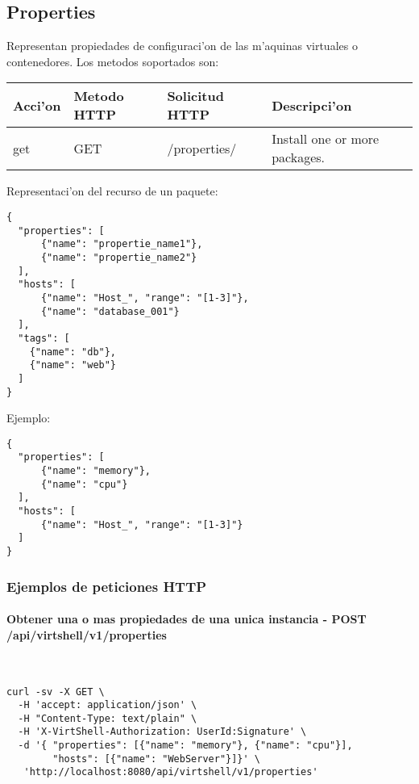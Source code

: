 \subsection{Properties}
Representan propiedades de configuraci'on de las m'aquinas virtuales o contenedores. Los metodos soportados son:

\begin{center}
 \begin{tabular}{| l | l | l | l |}
 \hline
  \rowcolor{blueapi}
  \textbf{Acci'on} & \textbf{Metodo HTTP} & \textbf{Solicitud HTTP} & \textbf{Descripci'on} \\ [0.5ex] 
  \hline\hline
  get & GET & /properties/ & Install one or more packages. \\ [1ex] 
  \hline
\end{tabular}
\end{center}

\vspace{1cm}
Representaci'on del recurso de un paquete:
\vspace{1cm}

\begin{lstlisting}[style=json]
{
  "properties": [
      {"name": "propertie_name1"},
      {"name": "propertie_name2"}
  ],
  "hosts": [ 
      {"name": "Host_", "range": "[1-3]"}, 
      {"name": "database_001"}
  ],
  "tags": [
    {"name": "db"},
    {"name": "web"}
  ]
}
\end{lstlisting}

Ejemplo:

\medskip
\begin{lstlisting}[style=json]
{
  "properties": [
      {"name": "memory"},
      {"name": "cpu"}
  ],
  "hosts": [ 
      {"name": "Host_", "range": "[1-3]"}
  ]
}
\end{lstlisting}

\subsubsection{Ejemplos de peticiones HTTP}

\paragraph{Obtener una o mas propiedades de una unica instancia - POST /api/virtshell/v1/properties} ~\\

\begin{lstlisting}[style=json]
curl -sv -X GET \
  -H 'accept: application/json' \
  -H "Content-Type: text/plain" \
  -H 'X-VirtShell-Authorization: UserId:Signature' \
  -d '{ "properties": [{"name": "memory"}, {"name": "cpu"}],
        "hosts": [{"name": "WebServer"}]}' \
   'http://localhost:8080/api/virtshell/v1/properties'
\end{lstlisting}

